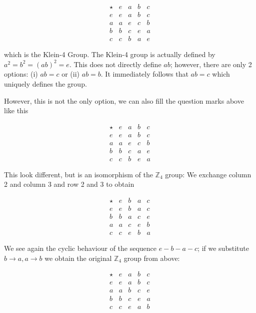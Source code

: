 \[
\begin{array}{c|cccc}
\star   & e     & a    & b   & c     \\
\hline
e       & e     & a    & b   & c     \\
a       & a     & e    & c   & b     \\
b       & b     & c    & e   & a     \\
c       & c     & b    & a   & e
\end{array}
\]

which is the Klein-4 Group. The Klein-4 group is actually defined by
\(a^2 = b^2 = (ab)^2 = e\). This does not directly define \(ab\);
however, there are only 2 options: (i) \(ab = c\) or (ii) \(ab = b\). It
immediately follows that \(ab=c\) which uniquely defines the group.

However, this is not the only option, we can also fill the question
marks above like this

\[
\begin{array}{c|cccc}
\star   & e     & a    & b   & c     \\
\hline
e       & e     & a    & b   & c     \\
a       & a     & e    & c   & b     \\
b       & b     & c    & a   & e     \\
c       & c     & b    & e   & a
\end{array}
\]

This look different, but is an isomorphism of the \(\mathbb{Z}_4\)
group: We exchange column 2 and column 3 and row 2 and 3 to obtain

\[
\begin{array}{c|cccc}
\star   & e     & b    & a   & c     \\
\hline
e       & e     & b    & a   & c     \\
b       & b     & a    & c   & e     \\
a       & a     & c    & e   & b     \\
c       & c     & e    & b   & a
\end{array}
\]

We see again the cyclic behaviour of the sequence \(e-b-a-c\); if we
substitute \(b \rightarrow a, a \rightarrow b\) we obtain the original
\(\mathbb{Z}_4\) group from above:

\[
\begin{array}{c|cccc}
\star   & e     & a    & b   & c     \\
\hline
e       & e     & a    & b   & c     \\
a       & a     & b    & c   & e     \\
b       & b     & c    & e   & a     \\
c       & c     & e    & a   & b
\end{array}
\]
